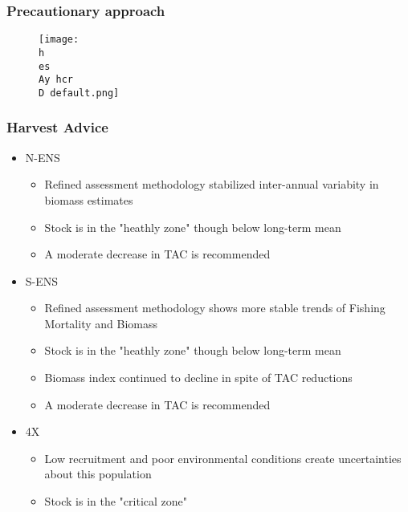 \documentclass{beamer}
\numberwithin{equation}{section}		%
\numberwithin{figure}{section}	   	%
\numberwithin{table}{section}				%
\newcommand{\D}{.}  %
\newcommand{\h}{C:/} %
\newcommand{\es}{bio.data/bio.snowcrab/} %
\newcommand{\Ay}{assessments/2017/}
\begin{document}



\begin{frame}
  \frametitle{Precautionary approach}
\begin{figure}
  \centering
  \texttt{[image: \\h \\es \\Ay hcr\\D default.png]}\\ 
\end{figure}
\end{frame}

\begin{frame}
\frametitle{Harvest Advice}

\begin{itemize}
	\item N-ENS
	\begin{itemize}
		\item Refined assessment methodology stabilized inter-annual variabity in biomass estimates
		\item Stock is in the "heathly zone" though below long-term mean
		\item A moderate decrease in TAC is recommended
	\end{itemize}
	\item S-ENS
	\begin{itemize}
		\item Refined assessment methodology shows more stable trends of Fishing Mortality and Biomass
		\item Stock is in the "heathly zone" though below long-term mean
		\item Biomass index continued to decline in spite of TAC reductions
		\item A moderate decrease in TAC is recommended
	\end{itemize}
	\item 4X
	\begin{itemize}
		\item Low recruitment and poor environmental conditions create uncertainties about this population
		\item Stock is in the "critical zone"
		
	\end{itemize}
\end{itemize}
\end{frame}

\end{document}
